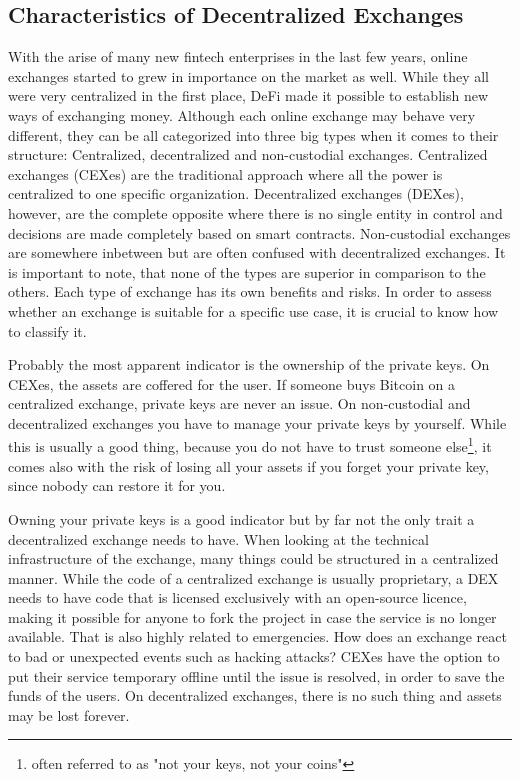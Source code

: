 \subsection{Characteristics of Decentralized Exchanges}
With the arise of many new fintech enterprises in the last few years, online exchanges started to grew in importance on the market as well. While they all were very centralized in the first place, DeFi made it possible to establish new ways of exchanging money. Although each online exchange may behave very different, they can be all categorized into three big types when it comes to their structure: Centralized, decentralized and non-custodial exchanges. Centralized exchanges (CEXes) are the traditional approach where all the power is centralized to one specific organization. Decentralized exchanges (DEXes), however, are the complete opposite where there is no single entity in control and decisions are made completely based on smart contracts. Non-custodial exchanges are somewhere inbetween but are often confused with decentralized exchanges. It is important to note, that none of the types are superior in comparison to the others. Each type of exchange has its own benefits and risks. In order to assess whether an exchange is suitable for a specific use case, it is crucial to know how to classify it.

Probably the most apparent indicator is the ownership of the private keys. On CEXes, the assets are coffered for the user. If someone buys Bitcoin on a centralized exchange, private keys are never an issue. On non-custodial and decentralized exchanges you have to manage your private keys by yourself. While this is usually a good thing, because you do not have to trust someone else\footnote{often referred to as "not your keys, not your coins"}, it comes also with the risk of losing all your assets if you forget your private key, since nobody can restore it for you.

Owning your private keys is a good indicator but by far not the only trait a decentralized exchange needs to have. When looking at the technical infrastructure of the exchange, many things could be structured in a centralized manner. While the code of a centralized exchange is usually proprietary, a DEX needs to have code that is licensed exclusively with an open-source licence, making it possible for anyone to fork the project in case the service is no longer available. That is also highly related to emergencies. How does an exchange react to bad or unexpected events such as hacking attacks? CEXes have the option to put their service temporary offline until the issue is resolved, in order to save the funds of the users. On decentralized exchanges, there is no such thing and assets may be lost forever.

